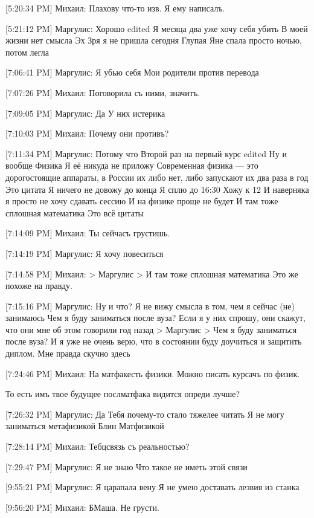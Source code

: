 \documentclass{article}
\newcommand{\yat}{{\fontencoding{X2}\selectfont\cyryat}} %
\begin{document}
{[5:20:34 PM] Михаил:
Плахову что-то изв. Я ему написалъ.

[5:21:12 PM] Маргулис:
Хорошо
edited 
Я месяца два уже хочу себя убить
 В моей жизни нет смысла
 Эх
 Зря я не пришла сегодня
 Глупая
 Яне спала просто ночью, потом легла

[7:06:41 PM] Маргулис:
Я убью себя
 Мои родители против перевода

[7:07:26 PM] Михаил:
Поговорила съ ними, значитъ.

[7:09:05 PM] Маргулис:
Да
 У них истерика

[7:10:03 PM] Михаил:
Почему они противъ?

[7:11:34 PM] Маргулис:
Потому что
 Второй раз на первый курс
edited 
Ну и вообще
 Физика
 Я её никуда не приложу
 Современная физика — это дорогостоящие аппараты, в России их либо нет, либо запускают их два раза в год
 Это цитата
 Я ничего не довожу до конца
 Я сплю до 16:30
 Хожу к 12
 И наверняка я просто не хочу сдавать сессию
 И на физике проще не будет
 И там тоже сплошная математика
 Это всё цитаты

[7:14:09 PM] Михаил:
Ты сейчасъ грустишь.

[7:14:19 PM] Маргулис:
Я хочу повеситься

[7:14:58 PM] Михаил:
> Маргулис
> И там тоже сплошная математика
Это же похоже на правду.

[7:15:16 PM] Маргулис:
Ну и что?
 Я не вижу смысла в том, чем я сейчас (не) занимаюсь
 Чем я буду заниматься после вуза?
 Если я у них спрошу, они скажут, что они мне об этом говорили год назад
> Маргулис
> Чем я буду заниматься после вуза?
И я уже не очень верю, что в состоянии буду доучиться и защитить диплом. Мне правда скучно здесь

[7:24:46 PM] Михаил:
На матфак\yat есть физики. Можно писать курсачъ по физик\yat.

То есть имъ твое будущее посл\yat матфака видится опред и лучше?

[7:26:32 PM] Маргулис:
Да
 Тебя почему-то стало тяжелее читать
 Я не могу заниматься метафизикой
 Блин
 Матфизикой

[7:28:14 PM] Михаил:
Теб\yat ц связь съ реальностью?

[7:29:47 PM] Маргулис:
Я не знаю
 Что такое не иметь этой связи

[9:55:21 PM] Маргулис:
Я царапала вену
 Я не умею доставать лезвия из станка

[9:56:20 PM] Михаил:
Б Маша.
 Не грусти.

}
\end{document}
